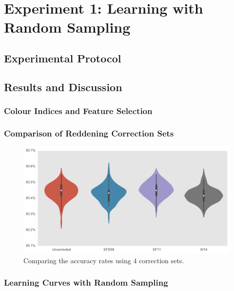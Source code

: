 
\chapter{Experiment 1: Learning with Random Sampling}
\label{cha:expt1}



\section{Experimental Protocol}
\label{sec:protocol1}



\section{Results and Discussion}
\label{sec:results1}

\subsection{Colour Indices and Feature Selection}






\subsection{Comparison of Reddening Correction Sets}

\begin{figure}[tbp]
	\centering
	\includegraphics[width=\textwidth]{figures/violin_reddening_correction}
	\caption{Comparing the accuracy rates using 4 correction sets.}
	\label{fig:reddeningviolin}
\end{figure}

\subsection{Learning Curves with Random Sampling}

